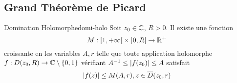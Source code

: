 \documentclass{cours}
\begin{document}
\subsection{Grand Théorème de Picard} 
\begin{lemme}
	{Domination Holomorphe}{domi-holo}
	Soit $z_{0} \in \mathbb{C}$, $R > 0$. Il existe une fonction
	\begin{equation*}
		M: \left[1, +\infty\right[ \times \left]0, R\right[ \to \mathbb{R}^{+}
	\end{equation*}
	croissante en les variables $A, r$ telle que toute application holomorphe $f: D(z_{0}, R) \to \mathbb{C}\setminus\{0, 1\}$ vérifiant $A^{-1}\leq \left|f(z_{0})\right| \leq A$ satisfait
	\begin{equation*}
		\left|f(z)\right| \leq M(A, r), z \in \overline{D}(z_{0}, r)
	\end{equation*}
\end{lemme}
\end{document}
